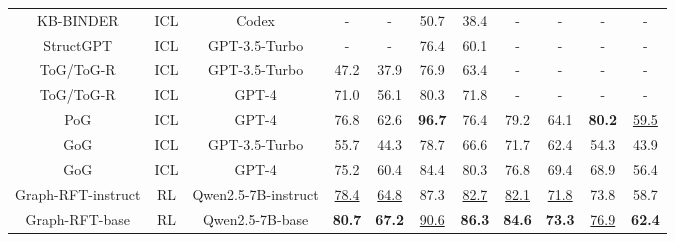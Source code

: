 \documentclass[sigconf]{acmart}
\begin{document}
\begin{table}[t]
\begin{tabular}{@{}ccccccccccc@{}}
\midrule
KB-BINDER\cite{li2023few}     & ICL   & Codex         & -  & -  & 50.7 & 38.4          & -      & -    & -  & -                     \\
StructGPT\cite{jiang2023structgpt}     & ICL   & GPT-3.5-Turbo & - & - & 76.4    & 60.1      & -     & -     & -    & -  
\\
ToG/ToG-R\cite{sun2023think}     & ICL   & GPT-3.5-Turbo         & 47.2 & 37.9 & 76.9 & 63.4          & -    & -      & -    & -                  \\ 
ToG/ToG-R\cite{sun2023think}     & ICL   & GPT-4         & 71.0 & 56.1 & 80.3 & 71.8    & -  & -        & -    & -              \\ 
PoG\cite{tan2025paths}     & ICL   & GPT-4        & 76.8 & 62.6 & \textbf{96.7} & 76.4   & 79.2  & 64.1       & \textbf{80.2}   & \underline{59.5}            \\ 
GoG\cite{xu2024generate}   & ICL   & GPT-3.5-Turbo         & 55.7 & 44.3 & 78.7  & 66.6         & 71.7  & 62.4        & 54.3   &  43.9                 \\ 
GoG\cite{xu2024generate}  & ICL   & GPT-4         & 75.2 & 60.4 & 84.4     & 80.3     & 76.8   & 69.4       & 68.9   & 56.4                \\ 
\midrule

Graph-RFT-instruct         &  RL  & Qwen2.5-7B-instruct & \underline{78.4}   & \underline{64.8}          &  87.3         & \underline{82.7} &\underline{82.1} &\underline{71.8} &73.8 & 58.7                \\
Graph-RFT-base         & RL   & Qwen2.5-7B-base &  \textbf{80.7}  &\textbf{67.2}           &   \underline{90.6}       &  \textbf{86.3} &\textbf{84.6} &\textbf{73.3} &\underline{76.9} &\textbf{62.4}                   \\ \bottomrule
\end{tabular}
\end{table}
\end{document}
